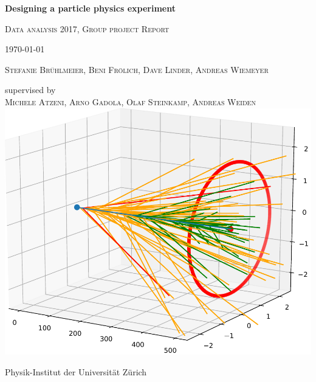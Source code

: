 \documentclass[12pt,a4paper,oneside,english]{article}
\begin{document}
\lstset{language=Python}
	\begin{titlepage}
		\centering
		{\huge\bfseries Designing a particle physics experiment \par}
		\vspace{1cm}
		{\scshape\Large Data analysis 2017, Group project Report\par}
		{\par}
		{\today\par}\par
		\textsc{Stefanie Brühlmeier, Beni Frölich, Dave Linder, Andreas Wiemeyer}
		{\par}
		{supervised by}\\
		 \textsc{Michele Atzeni, Arno Gadola, Olaf Steinkamp, Andreas Weiden}\\
		\vspace{1.4cm}
		 \includegraphics[width=0.9\linewidth]{images/titel_decay_bea3.pdf}\par
		\vspace{0.5cm}
		\Large{Physik-Institut der Universität Zürich}
	\end{titlepage}
	\tableofcontents
	\pagebreak
\end{document}
